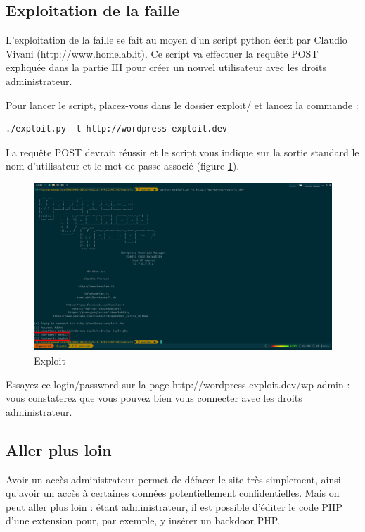 \documentclass[a4paper,oneside,10pt]{article}
\begin{document}
\subsection{Exploitation de la faille}
L’exploitation de la faille se fait au moyen d’un script python écrit par Claudio Vivani (http://www.homelab.it). Ce script va effectuer la requête POST expliquée dans la partie III pour créer un nouvel utilisateur avec les droits administrateur.

Pour lancer le script, placez-vous dans le dossier exploit/ et lancez la commande :
\begin{verbatim}
./exploit.py -t http://wordpress-exploit.dev
\end{verbatim}

La requête POST devrait réussir et le script vous indique sur la sortie standard le nom d’utilisateur et le mot de passe associé (figure \ref{exploit}).

\begin{figure}
\centering
\includegraphics[width=\textwidth]{img/exploit.png}
\caption{Exploit}
\label{exploit}
\end{figure} 

Essayez ce login/password sur la page http://wordpress-exploit.dev/wp-admin : vous constaterez que vous pouvez bien vous connecter avec les droits administrateur.
\vspace{4em}

\subsection{Aller plus loin}
Avoir un accès administrateur permet de défacer le site très simplement, ainsi qu’avoir un accès à certaines données potentiellement confidentielles. Mais on peut aller plus loin : étant administrateur, il est possible d’éditer le code PHP d’une extension pour, par exemple, y insérer un backdoor PHP.
\end{document}
